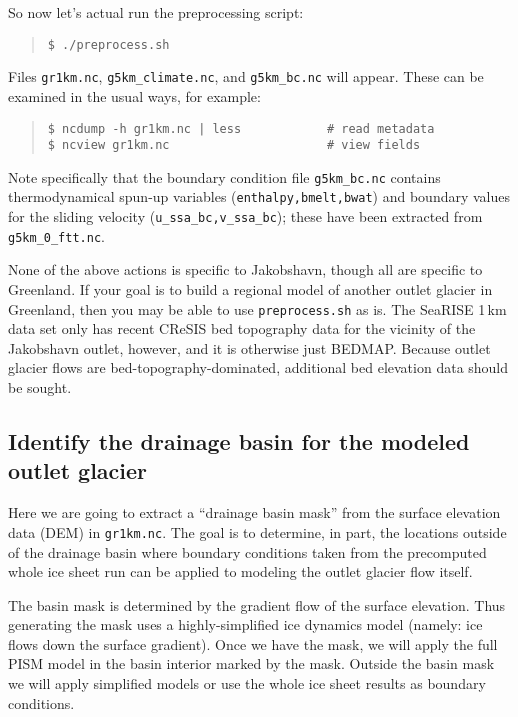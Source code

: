 So now let's actual run the preprocessing script:
\begin{quote}\small
\begin{verbatim}
$ ./preprocess.sh
\end{verbatim}
\normalsize\end{quote}
Files \texttt{gr1km.nc}, \texttt{g5km_climate.nc}, and \texttt{g5km_bc.nc} will appear.  These can be examined in the usual ways, for example:
\begin{quote}\small
\begin{verbatim}
$ ncdump -h gr1km.nc | less            # read metadata
$ ncview gr1km.nc                      # view fields
\end{verbatim}
\normalsize\end{quote}
Note specifically that the boundary condition file \texttt{g5km_bc.nc} contains thermodynamical spun-up variables (\texttt{enthalpy,bmelt,bwat}) and boundary values for the sliding velocity (\texttt{u_ssa_bc,v_ssa_bc}); these have been extracted from \texttt{g5km_0_ftt.nc}.

None of the above actions is specific to Jakobshavn, though all are specific to Greenland.  If your goal is to build a regional model of another outlet glacier in Greenland, then you may be able to use \texttt{preprocess.sh} as is.  The SeaRISE 1\,km data set only has recent CReSIS bed topography data for the vicinity of the Jakobshavn outlet, however, and it is otherwise just BEDMAP.  Because outlet glacier flows are bed-topography-dominated, additional bed elevation data should be sought.

\subsection*{Identify the drainage basin for the modeled outlet glacier}
Here we are going to extract a ``drainage basin mask'' from the surface elevation data (DEM) in \texttt{gr1km.nc}.  The goal is to determine, in part, the locations outside of the drainage basin where boundary conditions taken from the precomputed whole ice sheet run can be applied to modeling the outlet glacier flow itself.

The basin mask is determined by the gradient flow of the surface elevation.  Thus generating the mask uses a highly-simplified ice dynamics model (namely: ice flows down the surface gradient).  Once we have the mask, we will apply the full PISM model in the basin interior marked by the mask.  Outside the basin mask we will apply simplified models or use the whole ice sheet results as boundary conditions.

